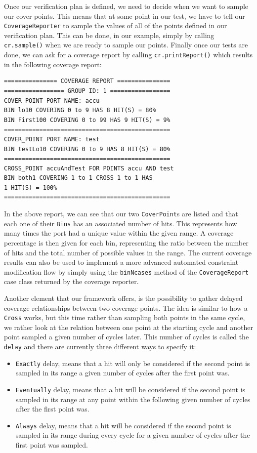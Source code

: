 \documentclass[conference]{IEEEtran}
\begin{document}
Once our verification plan is defined, we need to decide when we want to sample our cover points. This means that at some point in our test, we have to tell our \texttt{CoverageReporter} to sample the values of all of the points defined in our verification plan. This can be done, in our example, simply by calling \texttt{cr.sample()} when we are ready to sample our points. Finally once our tests are done, we can ask for a coverage report by calling \texttt{cr.printReport()} which results in the following coverage report: 
\begin{verbatim}
=============== COVERAGE REPORT ===============
================= GROUP ID: 1 =================
COVER_POINT PORT NAME: accu
BIN lo10 COVERING 0 to 9 HAS 8 HIT(S) = 80%
BIN First100 COVERING 0 to 99 HAS 9 HIT(S) = 9%
===============================================
COVER_POINT PORT NAME: test
BIN testLo10 COVERING 0 to 9 HAS 8 HIT(S) = 80%
===============================================
CROSS_POINT accuAndTest FOR POINTS accu AND test
BIN both1 COVERING 1 to 1 CROSS 1 to 1 HAS
1 HIT(S) = 100%
===============================================
\end{verbatim}
In the above report, we can see that our two \texttt{CoverPoint}s are listed and that each one of their \texttt{Bins} has an associated number of hits. This represents how many times the port had a unique value within the given range. A coverage percentage is then given for each bin, representing the ratio between the number of hits and the total number of possible values in the range.
The current coverage results can also be used to implement a more advanced automated constraint modification flow by simply using the \texttt{binNcases} method of the \texttt{CoverageReport} case class returned by the coverage reporter. 

Another element that our framework offers, is the possibility to gather delayed coverage relationships between two coverage points. The idea is similar to how a \texttt{Cross} works, but this time rather than sampling both points in the same cycle, we rather look at the relation between one point at the starting cycle and another point sampled a given number of cycles later. This number of cycles is called the \texttt{delay} and there are currently three different ways to specify it:  
\begin{itemize}
  \item \texttt{Exactly} delay, means that a hit will only be considered if the second point is sampled in its range a given number of cycles after the first point was.
  \item \texttt{Eventually} delay, means that a hit will be considered if the second point is sampled in its range at any point within the following given number of cycles after the first point was.  
  \item \texttt{Always} delay, means that a hit will be considered if the second point is sampled in its range during every cycle for a given number of cycles after the first point was sampled.
\end{itemize}
\end{document}
